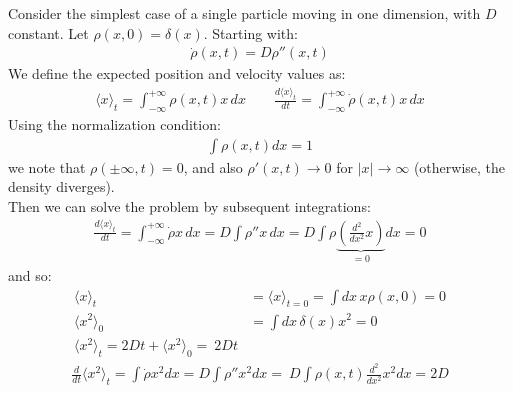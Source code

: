 \documentclass[../template.tex]{subfiles}
\begin{document}
Consider the simplest case of a single particle moving in one dimension, with $D$ constant. Let $\rho(x,0) = \delta (x)$. Starting with:
\begin{align*}
\dot{\rho}(x,t) = D\rho''(x,t)
\end{align*}
We define the expected position and velocity values as:
\begin{align*}
\langle x\rangle_t = \int_{-\infty}^{+\infty} \rho(x,t) x\,dx \qquad \frac{d\langle x\rangle_t}{dt} = \int_{-\infty}^{+\infty} \dot{\rho}(x,t)x\,dx
\end{align*}
Using the normalization condition:
\begin{align*}
\int \rho(x,t) dx = 1
\end{align*}
we note that $\rho(\pm \infty,t) = 0$, and also $\rho'(x,t) \to 0$ for $|x|\to \infty$ (otherwise, the density diverges).\\
Then we can solve the problem by subsequent integrations:
\begin{align*}
\frac{d\langle x\rangle_t}{dt} = \int_{-\infty}^{+\infty} \dot{\rho} x\,dx = D\int \rho''x\,dx = D \int \rho\underbrace{\left(\frac{d^2}{dx^2}x\right)}_{=0}dx = 0
\end{align*}
and so:
\begin{align*}
\langle x\rangle_t &= \langle x\rangle_{t=0} = \int dx\, x \rho(x,0) = 0\\
\langle x^2\rangle_0 &= \int dx\,\delta(x)x^2 = 0\\
\langle x^2\rangle_t = 2Dt + \langle x^2 \rangle_0 =\ 2Dt
\end{align*}
\begin{align*}
\frac{d}{dt} \langle x^2 \rangle_t = \int \dot{\rho} x^2 dx = D \int \rho'' x^2 dx =\ D \int \rho(x,t) \frac{d^2}{dx^2}x^2 dx = 2D
\end{align*}
\end{document}
